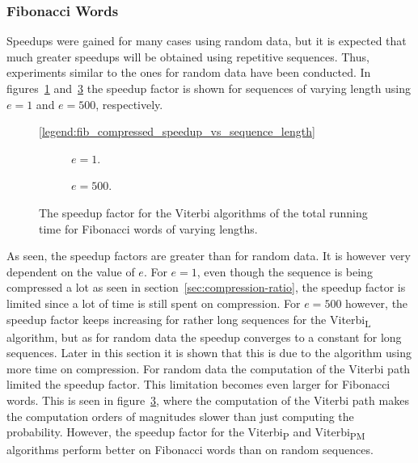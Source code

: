 \subsubsection{Fibonacci Words}

Speedups were gained for many cases using random data, but it is
expected that much greater speedups will be obtained using repetitive
sequences. Thus, experiments similar to the ones for random data have been
conducted. In figures~\ref{fig:fib_compressed_1_speedup_vs_sequence_length}
and~\ref{fig:fib_compressed_500_speedup_vs_sequence_length} the speedup factor
is shown for sequences of varying length using $e = 1$ and $e = 500$,
respectively.

\begin{figure}
  \centering\ref{legend:fib_compressed_speedup_vs_sequence_length}\\
  \begin{subfigure}[b]{0.5\textwidth}
    \centering 
    \caption{$e = 1$.}
    \label{fig:fib_compressed_1_speedup_vs_sequence_length}
  \end{subfigure}\hspace{-5mm}%
  \begin{subfigure}[b]{0.5\textwidth}
    \centering
    
    \caption{$e = 500$.}
    \label{fig:fib_compressed_500_speedup_vs_sequence_length}
  \end{subfigure}
  \caption{The speedup factor for the Viterbi algorithms of
      the total running time for Fibonacci words of varying lengths.}
\end{figure}

As seen, the speedup factors are greater than for random data. It is however
very dependent on the value of $e$. For $e = 1$, even though the sequence is
being compressed a lot as seen in section~\ref{sec:compression-ratio}, the
speedup factor is limited since a lot of time is still spent on compression.
For $e = 500$ however, the speedup factor keeps increasing for rather long
sequences for the Viterbi\textsubscript{L} algorithm, but as for random data
the speedup converges to a constant for long sequences. Later in this section
it is shown that this is due to the algorithm using more time on
compression. For random data the computation of the Viterbi path limited the
speedup factor. This limitation becomes even larger for Fibonacci words. This
is seen in figure~\ref{fig:fib_compressed_500_speedup_vs_sequence_length},
where the computation of the Viterbi path makes the computation orders of
magnitudes slower than just computing the probability. However, the speedup
factor for the Viterbi\textsubscript{P} and Viterbi\textsubscript{PM}
algorithms perform better on Fibonacci words than on random sequences.

